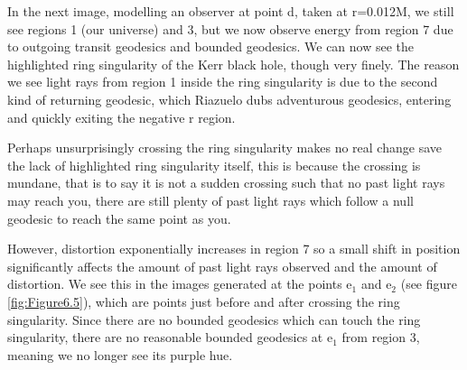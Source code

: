 \documentclass[oneside,openright,frontopenright, singlespacing]{dmathesis}
\begin{document}
\vspace{1em}
	In the next image, modelling an observer at point d, taken at r=0.012M, we still see regions 1 (our universe) and 3, but we now observe energy from region 7 due to outgoing transit geodesics and bounded geodesics. We can now see the highlighted ring singularity of the Kerr black hole, though very finely. The reason we see light rays from region 1 inside the ring singularity is due to the second kind of returning geodesic, which Riazuelo dubs adventurous geodesics, entering and quickly exiting the negative r region.

\vspace{1em}
	Perhaps unsurprisingly crossing the ring singularity makes no real change save the lack of highlighted ring singularity itself, this is because the crossing is mundane, that is to say it is not a sudden crossing such that no past light rays may reach you, there are still plenty of past light rays which follow a null geodesic to reach the same point as you.

\vspace{1em}
	However, distortion exponentially increases in region 7 so a small shift in position significantly affects the amount of past light rays observed and the amount of distortion. We see this in the images generated at the points e$_1$ and e$_2$ (see figure \ref{fig:Figure6.5}), which are points just before and after crossing the ring singularity. Since there are no bounded geodesics which can touch the ring singularity, there are no reasonable bounded geodesics at e$_1$ from region 3, meaning we no longer see its purple hue.
\end{document}
